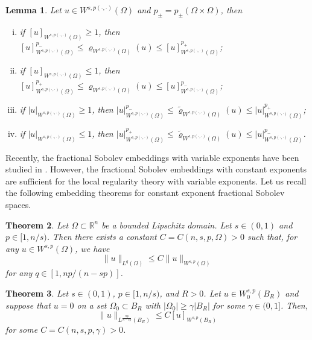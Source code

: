\documentclass[11pt]{amsart}
\theoremstyle{plain}
\newtheorem{theorem}{Theorem}[section]
\newtheorem{lemma}[theorem]{Lemma}
\theoremstyle{definition}
\numberwithin{equation}{section}
\begin{document}
\begin{lemma} \label{lem:modular}
Let $u \in W^{s, p(\cdot,\cdot)}(\Omega)$ and $p_\pm = p_\pm(\Omega \times \Omega)$, then
\begin{enumerate}[(i)]
\item
if $[u]_{W^{s,p(\cdot,\cdot)}(\Omega)} \geq 1$, then $[u]_{W^{s,p(\cdot,\cdot)}(\Omega)}^{p_-} \leq \varrho_{W^{s,p(\cdot,\cdot)}(\Omega)}(u) \leq [u]_{W^{s,p(\cdot,\cdot)}(\Omega)}^{p_+}$;
\item
if $[u]_{W^{s,p(\cdot,\cdot)}(\Omega)} \leq 1$, then $[u]_{W^{s,p(\cdot,\cdot)}(\Omega)}^{p_+} \leq \varrho_{W^{s,p(\cdot,\cdot)}(\Omega)}(u) \leq [u]_{W^{s,p(\cdot,\cdot)}(\Omega)}^{p_-}$;
\item
if $|u|_{W^{s,p(\cdot,\cdot)}(\Omega)} \geq 1$, then $|u|_{W^{s,p(\cdot,\cdot)}(\Omega)}^{p_-} \leq \tilde{\varrho}_{W^{s,p(\cdot,\cdot)}(\Omega)}(u) \leq |u|_{W^{s,p(\cdot,\cdot)}(\Omega)}^{p_+}$;
\item
if $|u|_{W^{s,p(\cdot,\cdot)}(\Omega)} \leq 1$, then $|u|_{W^{s,p(\cdot,\cdot)}(\Omega)}^{p_+} \leq \tilde{\varrho}_{W^{s,p(\cdot,\cdot)}(\Omega)}(u) \leq |u|_{W^{s,p(\cdot,\cdot)}(\Omega)}^{p_-}$.
\end{enumerate}
\end{lemma}

Recently, the fractional Sobolev embeddings with variable exponents have been studied in \cite{KRV17,HK19,HK21}. However, the fractional Sobolev embeddings with constant exponents are sufficient for the local regularity theory with variable exponents. Let us recall the following embedding theorems for constant exponent fractional Sobolev spaces.

\begin{theorem} \label{thm:sobolev} \cite[Theorem 6.7]{DNPV12}
Let $\Omega \subset \mathbb{R}^n$ be a bounded Lipschitz domain. Let $s \in (0,1)$ and $p \in [1, n/s)$. Then there exists a constant $C = C(n, s, p, \Omega) > 0$ such that, for any $u \in W^{s, p}(\Omega)$, we have
\begin{equation*}
\|u\|_{L^q(\Omega)} \leq C \|u\|_{W^{s, p}(\Omega)}
\end{equation*}
for any $q \in [1, np/(n-sp)]$.
\end{theorem}

\begin{theorem} \label{thm:homo_sobolev} \cite[Corollary 4.9]{Coz17}
Let $s \in (0,1)$, $p \in [1, n/s)$, and $R > 0$. Let $u \in W^{s, p}_0(B_R)$ and suppose that $u=0$ on a set $\Omega_0 \subset B_R$ with $|\Omega_0| \geq \gamma |B_R|$ for some $\gamma \in (0,1]$. Then,
\begin{equation*}
\|u\|_{L^{\frac{np}{n-sp}}(B_R)} \leq C [u]_{W^{s, p}(B_R)}
\end{equation*}
for some $C = C(n, s, p, \gamma) > 0$.
\end{theorem}
\end{document}
